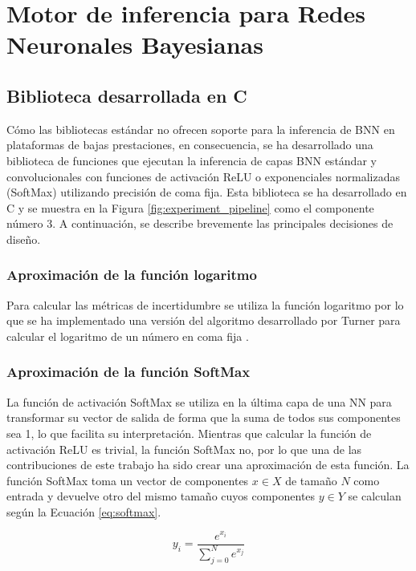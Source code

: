\chapter{Motor de inferencia para Redes Neuronales Bayesianas} \label{ch:motor_inferencia}

\section{Biblioteca desarrollada en C}

Cómo las bibliotecas estándar no ofrecen soporte para la inferencia de BNN en plataformas de bajas prestaciones, en consecuencia, se ha desarrollado una biblioteca de funciones que ejecutan la inferencia de capas BNN estándar y convolucionales con funciones de activación ReLU o exponenciales normalizadas (SoftMax) utilizando precisión de coma fija. Esta biblioteca se ha desarrollado en C y se muestra en la Figura \ref{fig:experiment_pipeline} como el componente número 3. A continuación, se describe brevemente las principales decisiones de diseño.

\subsection{Aproximación de la función logaritmo}

Para calcular las métricas de incertidumbre se utiliza la función logaritmo por lo que se ha implementado una versión del algoritmo desarrollado por Turner para calcular el logaritmo de un número en coma fija \cite{binary_log}.

\subsection{Aproximación de la función SoftMax}

La función de activación SoftMax se utiliza en la última capa de una NN para transformar su vector de salida de forma que la suma de todos sus componentes sea 1, lo que facilita su interpretación. Mientras que calcular la función de activación ReLU es trivial, la función SoftMax no, por lo que una de las contribuciones de este trabajo ha sido crear una aproximación de esta función. La función SoftMax toma un vector de componentes $x \in X$ de tamaño $N$ como entrada y devuelve otro del mismo tamaño cuyos componentes $y\in Y$ se calculan según la Ecuación \ref{eq:softmax}.

\begin{equation} \label{eq:softmax}
y_i = \dfrac{e^{x_i}}{\sum_{j = 0}^N e^{x_j}}
\end{equation}

